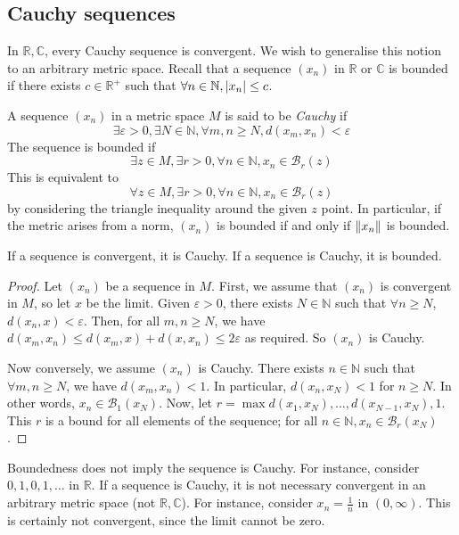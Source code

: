 \subsection{Cauchy sequences}
In \( \mathbb R, \mathbb C \), every Cauchy sequence is convergent.
We wish to generalise this notion to an arbitrary metric space.
Recall that a sequence \( (x_n) \) in \( \mathbb R \) or \( \mathbb C \) is bounded if there exists \( c \in \mathbb R^+ \) such that \( \forall n \in \mathbb N, \abs{x_n} \leq c \).
\begin{definition}
	A sequence \( (x_n) \) in a metric space \( M \) is said to be \textit{Cauchy} if
	\[
		\exists \varepsilon > 0, \exists N \in \mathbb N, \forall m,n \geq N, d(x_m,x_n) < \varepsilon
	\]
	The sequence is bounded if
	\[
		\exists z \in M, \exists r > 0, \forall n \in \mathbb N, x_n \in \mathcal B_r(z)
	\]
	This is equivalent to
	\[
		\forall z \in M, \exists r > 0, \forall n \in \mathbb N, x_n \in \mathcal B_r(z)
	\]
	by considering the triangle inequality around the given \( z \) point.
	In particular, if the metric arises from a norm, \( (x_n) \) is bounded if and only if \( \norm{x_n} \) is bounded.
\end{definition}
\begin{lemma}
	If a sequence is convergent, it is Cauchy.
	If a sequence is Cauchy, it is bounded.
\end{lemma}
\begin{proof}
	Let \( (x_n) \) be a sequence in \( M \).
	First, we assume that \( (x_n) \) is convergent in \( M \), so let \( x \) be the limit.
	Given \( \varepsilon > 0 \), there exists \( N \in \mathbb N \) such that \( \forall n \geq N \), \( d(x_n, x) < \varepsilon \).
	Then, for all \( m, n \geq N \), we have \( d(x_m, x_n) \leq d(x_m, x) + d(x, x_n) \leq 2\varepsilon \) as required.
	So \( (x_n) \) is Cauchy.

	Now conversely, we assume \( (x_n) \) is Cauchy.
	There exists \( n \in \mathbb N \) such that \( \forall m, n \geq N \), we have \( d(x_m, x_n) < 1 \).
	In particular, \( d(x_n, x_N) < 1 \) for \( n \geq N \).
	In other words, \( x_n \in \mathcal B_1(x_N) \).
	Now, let \( r = \max{d(x_1, x_N), \dots, d(x_{N-1}, x_N), 1} \).
	This \( r \) is a bound for all elements of the sequence; for all \( n \in \mathbb N, x_n \in \mathcal B_r(x_N) \).
\end{proof}
\begin{remark}
	Boundedness does not imply the sequence is Cauchy.
	For instance, consider \( 0,1,0,1,\dots \) in \( \mathbb R \).
	If a sequence is Cauchy, it is not necessary convergent in an arbitrary metric space (not \( \mathbb R, \mathbb C \)).
	For instance, consider \( x_n = \frac{1}{n} \) in \( (0, \infty) \).
	This is certainly not convergent, since the limit cannot be zero.
\end{remark}


